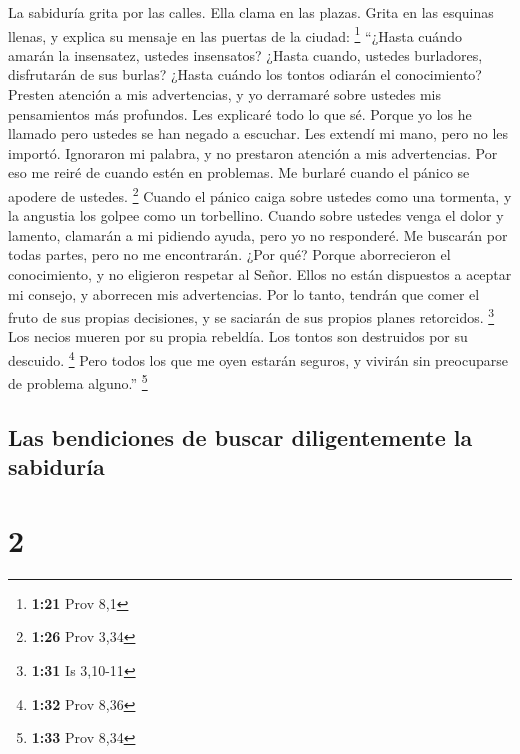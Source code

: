  La sabiduría grita por las calles. Ella clama en las
plazas.  Grita en las esquinas llenas, y explica su mensaje
en las puertas de la ciudad: \footnote{\textbf{1:21} Prov 8,1}
 ``¿Hasta cuándo amarán la insensatez, ustedes insensatos?
¿Hasta cuando, ustedes burladores, disfrutarán de sus burlas? ¿Hasta
cuándo los tontos odiarán el conocimiento?  Presten
atención a mis advertencias, y yo derramaré sobre ustedes mis
pensamientos más profundos. Les explicaré todo lo que sé. 
Porque yo los he llamado pero ustedes se han negado a escuchar. Les
extendí mi mano, pero no les importó.  Ignoraron mi
palabra, y no prestaron atención a mis advertencias.  Por
eso me reiré de cuando estén en problemas. Me burlaré cuando el pánico
se apodere de ustedes. \footnote{\textbf{1:26} Prov 3,34} 
Cuando el pánico caiga sobre ustedes como una tormenta, y la angustia
los golpee como un torbellino. Cuando sobre ustedes venga el dolor y
lamento,  clamarán a mi pidiendo ayuda, pero yo no
responderé. Me buscarán por todas partes, pero no me encontrarán.
 ¿Por qué? Porque aborrecieron el conocimiento, y no
eligieron respetar al Señor.  Ellos no están dispuestos a
aceptar mi consejo, y aborrecen mis advertencias.  Por lo
tanto, tendrán que comer el fruto de sus propias decisiones, y se
saciarán de sus propios planes retorcidos. \footnote{\textbf{1:31} Is
  3,10-11}  Los necios mueren por su propia rebeldía. Los
tontos son destruidos por su descuido. \footnote{\textbf{1:32} Prov 8,36}
 Pero todos los que me oyen estarán seguros, y vivirán sin
preocuparse de problema alguno.'' \footnote{\textbf{1:33} Prov 8,34}

\hypertarget{las-bendiciones-de-buscar-diligentemente-la-sabiduruxeda}{%
\subsection{Las bendiciones de buscar diligentemente la
sabiduría}\label{las-bendiciones-de-buscar-diligentemente-la-sabiduruxeda}}

\hypertarget{section-1}{%
\section{2}\label{section-1}}

